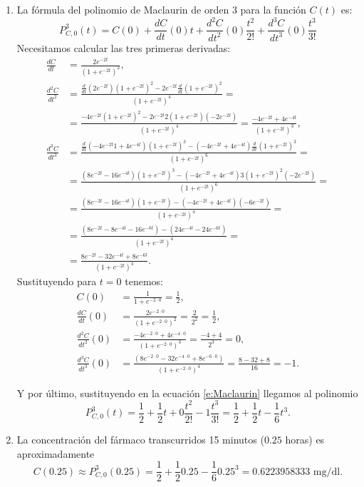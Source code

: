 {\begin{enumerate}
\item
La fórmula del polinomio de Maclaurin de orden 3 para la función $C(t)$ es:
\begin{equation}
\label{e:Maclaurin}
P_{C,0}^3(t)=C(0)+\frac{dC}{dt}(0)t+\frac{d^2C}{dt^2}(0)\frac{t^2}{2!}+\frac{d^3C}{dt^3}(0)\frac{t^3}{3!}
\end{equation}
Necesitamos calcular las tres primeras derivadas:
\begin{align*}
\frac{dC}{dt} &= \frac{2e^{-2t}}{(1+e^{-2t})^2},\\
\frac{d^2C}{dt^2} &=
\frac{\frac{d}{dt}(2e^{-2t})(1+e^{-2t})^2-2e^{-2t}\frac{d}{dt}(1+e^{-2t})^2}{(1+e^{-2t})^4} =\\
&= \frac{-4e^{-2t}(1+e^{-2t})^2- 2e^{-2t}2(1+e^{-2t})(-2e^{-2t})}{(1+e^{-2t})^4}
= \frac{-4e^{-2t}+4e^{-4t}}{(1+e^{-2t})^3},\\
\frac{d^3C}{dt^3}
&=
\frac{\frac{d}{dt}(-4e^{-2t}1+4e^{-4t})(1+e^{-2t})^3-(-4e^{-2t}+4e^{-4t})\frac{d}{dt}(1+e^{-2t})^3}{(1+e^{-2t})^6}=\\
&=
\frac{(8e^{-2t}-16e^{-4t})(1+e^{-2t})^3-(-4e^{-2t}+4e^{-4t})3(1+e^{-2t})^2(-2e^{-2t})}{(1+e^{-2t})^6}=\\
&=
\frac{(8e^{-2t}-16e^{-4t})(1+e^{-2t})-(-4e^{-2t}+4e^{-4t})(-6e^{-2t})}{(1+e^{-2t})^4}=\\
&=
\frac{(8e^{-2t}-8e^{-4t}-16e^{-6t})-(24e^{-4t}-24e^{-6t})}{(1+e^{-2t})^4}=\\
&=
\frac{8e^{-2t}-32e^{-4t}+8e^{-6t}}{(1+e^{-2t})^4}.
\end{align*}
Sustituyendo para $t=0$ tenemos:
\begin{align*}
C(0)&= \frac{1}{1+e^{-2\cdot 0}}=\frac{1}{2},\\
\frac{dC}{dt}(0) &= \frac{2e^{-2\cdot 0}}{(1+e^{-2\cdot 0})^2} = \frac{2}{2^2}=\frac{1}{2},\\
\frac{d^2C}{dt^2}(0) &= \frac{-4e^{-2\cdot 0}+4e^{-4\cdot 0}}{(1+e^{-2\cdot
0})^3} = \frac{-4+4}{2^3}= 0,\\
\frac{d^3C}{dt^3}(0)&=\frac{(8e^{-2\cdot 0}-32e^{-4\cdot 0}+8e^{-6\cdot 0})}{(1+e^{-2\cdot 0})^4}=\frac{8-32+8}{16}=-1.
\end{align*}

Y por último, sustituyendo en la ecuación \ref{e:Maclaurin} llegamos al polinomio
\[
P_{C,0}^3(t)=\frac{1}{2}+\frac{1}{2}t+0\frac{t^2}{2!}-1\frac{t^3}{3!}=\frac{1}{2}+\frac{1}{2}t-\frac{1}{6}t^3.
\]

\item La concentración del fármaco transcurridos 15 minutos ($0.25$ horas) es aproximadamente
\[
C(0.25)\approx P_{C,0}^3(0.25)= \frac{1}{2}+\frac{1}{2}0.25-\frac{1}{6}0.25^3= 0.6223958333 \mbox{ mg/dl}.
\]
\end{enumerate}
}


